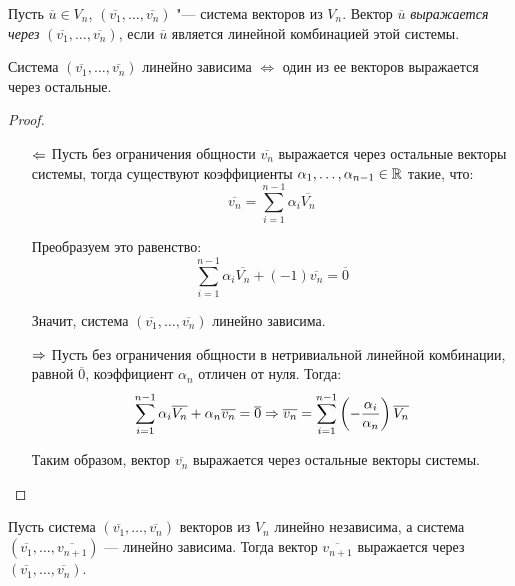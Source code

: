 \begin{definition}
	Пусть $\overline{u} \in V_n$, $(\overline{v_1}, \dots, \overline{v_n})$ "--- система векторов из $V_n$. Вектор $\overline{u}$ \textit{выражается через} $(\overline{v_1}, \dots, \overline{v_n})$, если $\overline{u}$ является линейной комбинацией этой системы.
\end{definition}

\begin{proposition}
	Система $(\overline{v_1}, \dots, \overline{v_n})$ линейно зависима $\Leftrightarrow$ один из ее векторов выражается через остальные.
\end{proposition}

\begin{proof}~
	\begin{itemize}
		\item[$\Leftarrow$] Пусть без ограничения общности $\overline{v_n}$ выражается через остальные векторы системы, тогда существуют коэффициенты $\alpha_1, \dotsc, \alpha_{n-1} \in \mathbb{R}$ такие, что:
		\pagebreak
		\[\overline{v_n} = \sum_{i = 1}^{n - 1}\alpha_i\overline{V_n}\]
		
		Преобразуем это равенство:
		\[\sum_{i = 1}^{n - 1}\alpha_i\overline{V_n} + (-1)\overline{v_n} = \overline{0}\]
		
		Значит, система $(\overline{v_1}, \dotsc, \overline{v_n})$ линейно зависима.
		
		\item[$\Rightarrow$] Пусть без ограничения общности в нетривиальной линейной комбинации, равной $\overline{0}$, коэффициент $\alpha_n$ отличен от нуля. Тогда:
		\[\sum_{i = 1}^{n - 1}\alpha_i\overline{V_n} + \alpha_n\overline{v_n} = \overline{0} \Rightarrow
		\overline{v_n} = \sum_{i = 1}^{n - 1}\left(-\frac{\alpha_i}{\alpha_n}\right)\overline{V_n}\]
			
		Таким образом, вектор $\overline{v_n}$ выражается через остальные векторы системы. \qedhere
	\end{itemize}
 
\end{proof}

\begin{proposition}
	Пусть система $(\overline{v_1}, \dots, \overline{v_n})$ векторов из $V_n$ линейно независима, а система $(\overline{v_1}, \dots, \overline{v_{n + 1}})$ --- линейно зависима. Тогда вектор $\overline{v_{n + 1}}$ выражается через $(\overline{v_1}, \dots, \overline{v_n})$.
\end{proposition}

